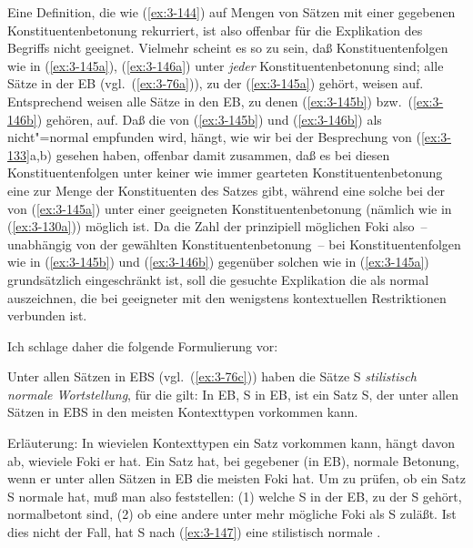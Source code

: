 \documentclass[output=paper]{langsci/langscibook}
\begin{document}
Eine Definition, die wie (\ref{ex:3-144}) auf Mengen von Sätzen mit einer
gegebenen Konstituentenbetonung rekurriert, ist also offenbar für die Explikation des Begriffs  nicht geeignet. Vielmehr scheint es so zu sein, daß Konstituentenfolgen wie in (\ref{ex:3-145a}), (\ref{ex:3-146a}) unter \textit{jeder} Konstituentenbetonung  sind; \dash alle Sätze in der EB (vgl.\ (\ref{ex:3-76a})), zu der (\ref{ex:3-145a}) gehört, weisen   auf. Entsprechend weisen alle Sätze in den EB, zu denen (\ref{ex:3-145b}) bzw.\ (\ref{ex:3-146b}) gehören,   auf. Daß die  von (\ref{ex:3-145b}) und (\ref{ex:3-146b}) als nicht"=normal empfunden wird, hängt, wie wir bei der Besprechung von (\ref{ex:3-133}a,b) gesehen haben, offenbar damit zusammen, daß es bei diesen Konstituentenfolgen unter keiner wie immer gearteten Konstituentenbetonung eine  zur Menge der Konstituenten des Satzes gibt, während eine solche  bei der  von (\ref{ex:3-145a}) unter einer geeigneten Konstituentenbetonung (nämlich wie in (\ref{ex:3-130a})) möglich ist. Da die Zahl der prinzipiell möglichen Foki also~-- unabhängig von der gewählten Konstituentenbetonung~-- bei Konstituentenfolgen wie in (\ref{ex:3-145b}) und (\ref{ex:3-146b}) gegenüber solchen wie in (\ref{ex:3-145a}) grundsätzlich
eingeschränkt ist, soll die gesuchte Explikation die  als
normal auszeichnen, die bei geeigneter  mit den wenigstens
kontextuellen Restriktionen verbunden ist.

Ich schlage daher die folgende Formulierung vor:
\begin{exe}
\ex\label{ex:3-147}
Unter allen Sätzen in EBS (vgl.\ (\ref{ex:3-76c})) haben die Sätze S\textit{}
\textit{stilistisch normale Wortstellung}, für die gilt: In EB, S\textit{} in EB,
ist ein Satz S\textit{}, der unter allen Sätzen in EBS in den meisten
Kontexttypen vorkommen kann.
\end{exe}
Erläuterung: In wievielen Kontexttypen ein Satz vorkommen kann, hängt davon ab, wieviele Foki er hat. Ein Satz hat, bei gegebener  (\dash in EB), normale Betonung, wenn er unter allen Sätzen in EB die meisten Foki hat. Um zu prüfen, ob ein Satz S normale  hat, muß man also feststellen: (1) welche S in der EB, zu der S gehört, normalbetont sind, (2) ob eine andere  unter  mehr mögliche Foki als S zuläßt. Ist dies nicht der Fall, hat S nach (\ref{ex:3-147}) eine stilistisch normale .
\end{document}
